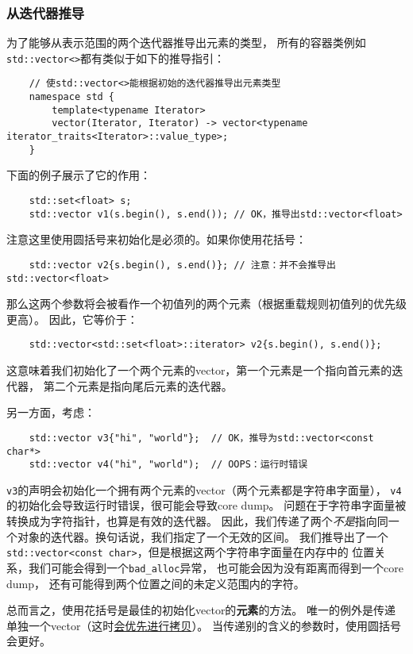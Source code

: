 \subsubsection{从迭代器推导}
为了能够从表示范围的两个迭代器推导出元素的类型，
所有的容器类例如\texttt{std::vector<>}都有类似于如下的推导指引：
\begin{lstlisting}
    // 使std::vector<>能根据初始的迭代器推导出元素类型
    namespace std {
        template<typename Iterator>
        vector(Iterator, Iterator) -> vector<typename iterator_traits<Iterator>::value_type>;
    }
\end{lstlisting}
下面的例子展示了它的作用：
\begin{lstlisting}
    std::set<float> s;
    std::vector v1(s.begin(), s.end()); // OK，推导出std::vector<float>
\end{lstlisting}
注意这里使用圆括号来初始化是必须的。如果你使用花括号：
\begin{lstlisting}
    std::vector v2{s.begin(), s.end()}; // 注意：并不会推导出std::vector<float>
\end{lstlisting}
那么这两个参数将会被看作一个初值列的两个元素（根据重载规则初值列的优先级更高）。
因此，它等价于：
\begin{lstlisting}
    std::vector<std::set<float>::iterator> v2{s.begin(), s.end()};
\end{lstlisting}
这意味着我们初始化了一个两个元素的vector，第一个元素是一个指向首元素的迭代器，
第二个元素是指向尾后元素的迭代器。

另一方面，考虑：
\begin{lstlisting}
    std::vector v3{"hi", "world"};  // OK，推导为std::vector<const char*>
    std::vector v4("hi", "world");  // OOPS：运行时错误
\end{lstlisting}
\texttt{v3}的声明会初始化一个拥有两个元素的vector（两个元素都是字符串字面量），
\texttt{v4}的初始化会导致运行时错误，很可能会导致core dump。
问题在于字符串字面量被转换成为字符指针，也算是有效的迭代器。
因此，我们传递了两个\emph{不是}指向同一个对象的迭代器。换句话说，我们指定了一个无效的区间。
我们推导出了一个\texttt{std::vector<const char>}，但是根据这两个字符串字面量在内存中的
位置关系，我们可能会得到一个\texttt{bad\_alloc}异常，
也可能会因为没有距离而得到一个core dump，
还有可能得到两个位置之间的未定义范围内的字符。

总而言之，使用花括号是最佳的初始化vector的\textbf{元素}的方法。
唯一的例外是传递单独一个vector（这时\hyperref[ch9.1.1]{会优先进行拷贝}）。
当传递别的含义的参数时，使用圆括号会更好。

